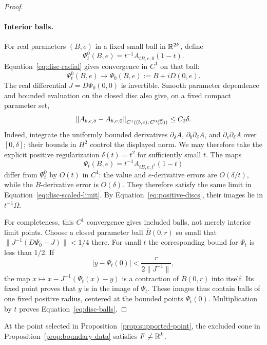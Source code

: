 \begin{proof}
\paragraph{Interior balls.}
For real parameters $(B,e)$ in a fixed small ball in $\mathbb R^{2k}$, define
\[
 \Psi_t^0(B,e)=t^{-1}A_{tB,e,0}(1-t).
\]
Equation~\eqref{eq:disc-radial} gives convergence in $C^1$ on that ball:
\begin{equation}\label{eq:disc-scaled-limit}
 \Psi_t^0(B,e)\longrightarrow\Psi_0(B,e):=B+iD(0,e).
\end{equation}
The real differential $J=D\Psi_0(0,0)$ is invertible.
Smooth parameter dependence and bounded evaluation on the closed disc
also give, on a fixed compact parameter set,
\[
 \|A_{b,e,\delta}-A_{b,e,0}\|
       _{C^1((b,e);\,C^0(\overline{\mathbb D}))}\le C_2\delta.
\]
Indeed, integrate the uniformly bounded derivatives $\partial_\delta A$,
$\partial_b\partial_\delta A$, and $\partial_e\partial_\delta A$
over $[0,\delta]$; their bounds in $H^2$ control the displayed norm.
We may therefore take the explicit positive regularization
$\delta(t)=t^2$ for sufficiently small $t$.  The maps
\[
 \Psi_t(B,e)=t^{-1}A_{tB,e,t^2}(1-t)
\]
differ from $\Psi_t^0$ by $O(t)$ in $C^1$: the value and $e$-derivative
errors are $O(\delta/t)$, while the $B$-derivative error is $O(\delta)$.
They therefore satisfy the same limit
in Equation~\eqref{eq:disc-scaled-limit}.  By
Equation~\eqref{eq:positive-discs}, their images lie in $t^{-1}\Omega$.

For completeness, this $C^1$ convergence gives included balls, not
merely interior limit points.  Choose a closed parameter ball
$\overline B(0,r)$ so small that
$\|J^{-1}(D\Psi_0-J)\|<1/4$ there.  For small $t$ the corresponding
bound for $\Psi_t$ is less than $1/2$.  If
\[
 |y-\Psi_t(0)|<\frac{r}{2\|J^{-1}\|},
\]
the map $x\mapsto x-J^{-1}(\Psi_t(x)-y)$ is a contraction of
$\overline B(0,r)$ into itself.  Its fixed point proves that $y$ is
in the image of $\Psi_t$.  These images thus contain balls of one
fixed positive radius, centered at the bounded points $\Psi_t(0)$.
Multiplication by $t$ proves Equation~\eqref{eq:disc-balls}.
\end{proof}

\begin{proposition}[Noncollapse]\label{prop:noncollapse}
At the point selected in Proposition~\ref{prop:supported-point}, the
excluded cone in Proposition~\ref{prop:boundary-data} satisfies
$F\ne\mathbb R^k$.
\end{proposition}


